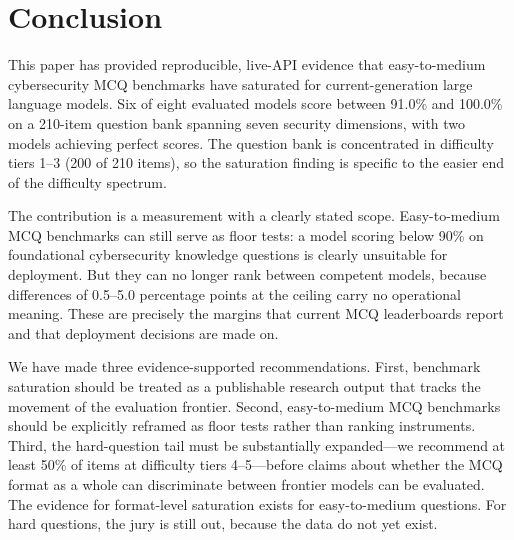 \documentclass[journal]{IEEEtran}
\begin{document}
\section{Conclusion}

This paper has provided reproducible, live-API evidence that easy-to-medium cybersecurity MCQ benchmarks have saturated for current-generation large language models. Six of eight evaluated models score between 91.0\% and 100.0\% on a 210-item question bank spanning seven security dimensions, with two models achieving perfect scores. The question bank is concentrated in difficulty tiers 1--3 (200 of 210 items), so the saturation finding is specific to the easier end of the difficulty spectrum.

The contribution is a measurement with a clearly stated scope. Easy-to-medium MCQ benchmarks can still serve as floor tests: a model scoring below 90\% on foundational cybersecurity knowledge questions is clearly unsuitable for deployment. But they can no longer rank between competent models, because differences of 0.5--5.0 percentage points at the ceiling carry no operational meaning. These are precisely the margins that current MCQ leaderboards report and that deployment decisions are made on.

We have made three evidence-supported recommendations. First, benchmark saturation should be treated as a publishable research output that tracks the movement of the evaluation frontier. Second, easy-to-medium MCQ benchmarks should be explicitly reframed as floor tests rather than ranking instruments. Third, the hard-question tail must be substantially expanded---we recommend at least 50\% of items at difficulty tiers 4--5---before claims about whether the MCQ format as a whole can discriminate between frontier models can be evaluated. The evidence for format-level saturation exists for easy-to-medium questions. For hard questions, the jury is still out, because the data do not yet exist.

\balance
\end{document}
